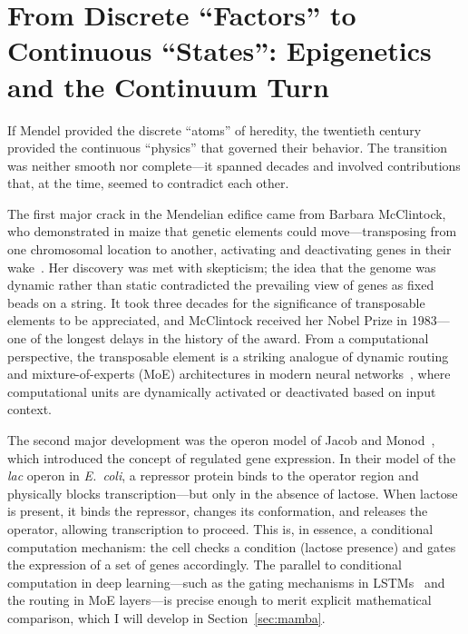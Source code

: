 \documentclass[12pt,a4paper]{article}
\begin{document}
\section{From Discrete ``Factors'' to Continuous ``States'': Epigenetics and the Continuum Turn}
\label{sec:epigenetics}

If Mendel provided the discrete ``atoms'' of heredity, the twentieth century provided the continuous ``physics'' that governed their behavior. The transition was neither smooth nor complete---it spanned decades and involved contributions that, at the time, seemed to contradict each other.

The first major crack in the Mendelian edifice came from Barbara McClintock, who demonstrated in maize that genetic elements could move---transposing from one chromosomal location to another, activating and deactivating genes in their wake~\cite{mcclintock1950}. Her discovery was met with skepticism; the idea that the genome was dynamic rather than static contradicted the prevailing view of genes as fixed beads on a string. It took three decades for the significance of transposable elements to be appreciated, and McClintock received her Nobel Prize in 1983---one of the longest delays in the history of the award. From a computational perspective, the transposable element is a striking analogue of dynamic routing and mixture-of-experts (MoE) architectures in modern neural networks~\cite{shazeer2017}, where computational units are dynamically activated or deactivated based on input context.

The second major development was the operon model of Jacob and Monod~\cite{jacob1961}, which introduced the concept of regulated gene expression. In their model of the \emph{lac} operon in \emph{E.~coli}, a repressor protein binds to the operator region and physically blocks transcription---but only in the absence of lactose. When lactose is present, it binds the repressor, changes its conformation, and releases the operator, allowing transcription to proceed. This is, in essence, a conditional computation mechanism: the cell checks a condition (lactose presence) and gates the expression of a set of genes accordingly. The parallel to conditional computation in deep learning---such as the gating mechanisms in LSTMs~\cite{hochreiter1997} and the routing in MoE layers---is precise enough to merit explicit mathematical comparison, which I will develop in Section~\ref{sec:mamba}.
\end{document}
